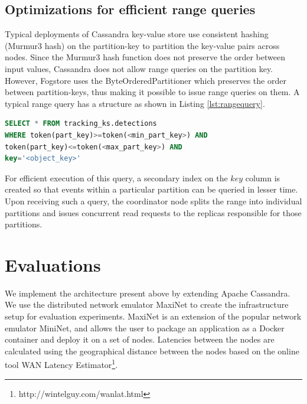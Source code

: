 \subsection{Optimizations for efficient range queries}
 Typical deployments of Cassandra key-value store use consistent hashing (Murmur3 hash) on the partition-key to partition the key-value pairs across nodes. Since the Murmur3 hash function does not preserve the order between input values, Cassandra does not allow range queries on the partition key. However, Fogstore uses the ByteOrderedPartitioner which preserves the order between partition-keys, thus making it possible to issue range queries on them. A typical range query has a structure as shown in Listing \ref{lst:rangequery}.
\begin{lstlisting}[caption={Typical form of a range query that Fogstore handles. The minimum and maximum limits of partition key range queried for is calculated based on the bounding-box of locations that forms the range query. Note that we omit timestamp based filtering for simplicity, however that can be incorporated in the query provided a secondary index is built on the timestamp field.},captionpos=b,label={lst:rangequery},language=SQL]
SELECT * FROM tracking_ks.detections 
WHERE token(part_key)>=token(<min_part_key>) AND 
token(part_key)<=token(<max_part_key>) AND 
key='<object_key>' 
\end{lstlisting}
\par For efficient execution of this query, a secondary index on the $key$ column is created so that events within a particular partition can be queried in lesser time. Upon receiving such a query, the coordinator node splits the range into individual partitions and issues concurrent read requests to the replicas responsible for those partitions. 

\section{Evaluations}
\label{sec:evals}
We implement the architecture present above by extending Apache Cassandra. We use the distributed network emulator MaxiNet \cite{maxinet} to create the infrastructure setup for evaluation experiments. MaxiNet is an extension of the popular network emulator MiniNet, and allows the user to package an application as a Docker container and deploy it on a set of nodes. Latencies between the nodes are calculated using the geographical distance between the nodes based on the online tool WAN Latency Estimator\footnote{http://wintelguy.com/wanlat.html}.

